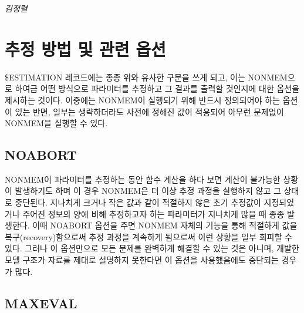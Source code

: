 \documentclass[
  10pt,
  krantz2,
  a4paper]{krantz}
\newenvironment{Shaded}{\begin{snugshade}}{\end{snugshade}}
\newcommand{\DecValTok}[1]{\textcolor[rgb]{0.00,0.00,0.81}{#1}}
\newcommand{\NormalTok}[1]{#1}
\newcommand{\OperatorTok}[1]{\textcolor[rgb]{0.81,0.36,0.00}{\textbf{#1}}}
\theoremstyle{definition}
\theoremstyle{definition}
\theoremstyle{definition}
\theoremstyle{remark}
\begin{document}
\emph{김정렬}

\hypertarget{uxcd94uxc815-uxbc29uxbc95-uxbc0f-uxad00uxb828-uxc635uxc158}{%
\section{추정 방법 및 관련 옵션}\label{uxcd94uxc815-uxbc29uxbc95-uxbc0f-uxad00uxb828-uxc635uxc158}}

\begin{Shaded}
\end{Shaded}

\$ESTIMATION 레코드에는 종종 위와 유사한 구문을 쓰게 되고, 이는 NONMEM으로 하여금 어떤 방식으로 파라미터를 추정하고 그 결과를 출력할 것인지에 대한 옵션을 제시하는 것이다. 이중에는 NONMEM이 실행되기 위해 반드시 정의되어야 하는 옵션이 있는 반면, 일부는 생략하더라도 사전에 정해진 값이 적용되어 아무런 문제없이 NONMEM을 실행할 수 있다.

\hypertarget{noabort}{%
\subsection{NOABORT}\label{noabort}}

NONMEM이 파라미터를 추정하는 동안 함수 계산을 하다 보면 계산이 불가능한 상황이 발생하기도 하며 이 경우 NONMEM은 더 이상 추정 과정을 실행하지 않고 그 상태로 중단된다. 지나치게 크거나 작은 값과 같이 적절하지 않은 초기 추정값이 지정되었거나 주어진 정보의 양에 비해 추정하고자 하는 파라미터가 지나치게 많을 때 종종 발생한다. 이때 NOABORT 옵션을 주면 NONMEM 자체의 기능을 통해 적절하게 값을 복구(recovery)함으로써 추정 과정을 계속하게 됨으로써 이런 상황을 일부 회피할 수 있다. 그러나 이 옵션만으로 모든 문제를 완벽하게 해결할 수 있는 것은 아니며, 개발한 모델 구조가 자료를 제대로 설명하지 못한다면 이 옵션을 사용했음에도 중단되는 경우가 많다.

\hypertarget{maxeval}{%
\subsection{MAXEVAL}\label{maxeval}}
\end{document}
